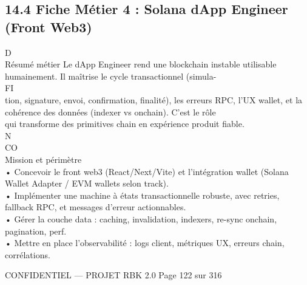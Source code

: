 \documentclass[12pt,landscape,a4paper]{article}
\newenvironment{confidential}
{\begin{tcolorbox}[
    colback=rbkred!5!white,
    colframe=rbkred!75!black,
    title=CONFIDENTIEL,
    fonttitle=\bfseries\color{white},
    coltitle=rbkred!75!black,
    breakable,
    enhanced,
    frame hidden,
    borderline west={2pt}{0pt}{rbkred!75!black}
]}
{\end{tcolorbox}}
\begin{document}
\subsection{14.4 Fiche Métier 4 : Solana dApp Engineer (Front Web3)}
\vspace{0.5em}
\vspace{0.5em}
\vspace{0.5em}
\vspace{0.5em}
D\\
Résumé métier Le dApp Engineer rend une blockchain instable utilisable humainement. Il maîtrise le cycle transactionnel (simula-\\
\vspace{0.5em}
\vspace{0.5em}
\vspace{0.5em}
\vspace{0.5em}
FI\\
tion, signature, envoi, confirmation, finalité), les erreurs RPC, l’UX wallet, et la cohérence des données (indexer vs onchain). C’est le rôle\\
qui transforme des primitives chain en expérience produit fiable.\\
N\\
CO\\
Mission et périmètre\\
\vspace{0.5em}
• Concevoir le front web3 (React/Next/Vite) et l’intégration wallet (Solana Wallet Adapter / EVM wallets selon track).\\
\vspace{0.5em}
• Implémenter une machine à états transactionnelle robuste, avec retries, fallback RPC, et messages d’erreur actionnables.\\
\vspace{0.5em}
• Gérer la couche data : caching, invalidation, indexers, re-sync onchain, pagination, perf.\\
\vspace{0.5em}
• Mettre en place l’observabilité : logs client, métriques UX, erreurs chain, corrélations.\\
\vspace{0.5em}
\vspace{0.5em}
\vspace{0.5em}
\vspace{0.5em}
\begin{confidential}CONFIDENTIEL — PROJET RBK 2.0                                   Page 122 sur 316\end{confidential}
\end{document}
